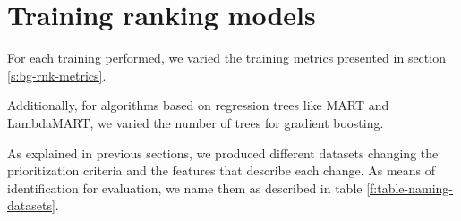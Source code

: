 \section{Training ranking models}\label{s:method-training-models}

For each training performed, we varied the training metrics presented in section \ref{s:bg-rnk-metrics}. 

Additionally, for algorithms based on regression trees like MART and LambdaMART, we varied
the number of trees for gradient boosting.

As explained in previous sections, we produced different datasets changing the prioritization
criteria and the features that describe each change. As means of identification for evaluation, 
we name them as described in table \ref{f:table-naming-datasets}.

